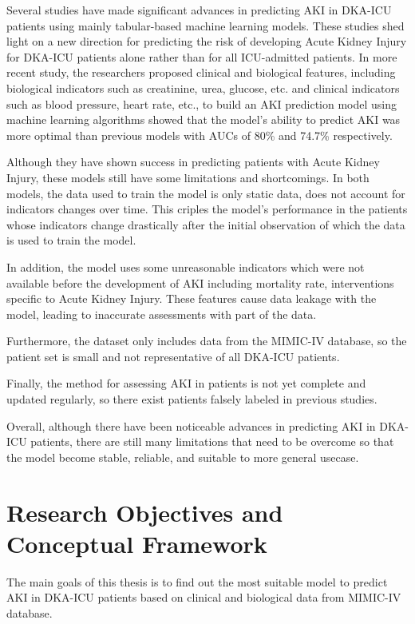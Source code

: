 \documentclass[../main.tex]{subfiles}
\begin{document}
Several studies have made significant advances in predicting AKI in DKA-ICU patients using mainly tabular-based machine learning models.
These studies shed light on a new direction for predicting the risk of developing Acute Kidney Injury for DKA-ICU patients alone rather than for all ICU-admitted patients.
In more recent study, the researchers proposed clinical and biological features, including biological indicators such as creatinine, urea, glucose, etc. and clinical indicators such as blood pressure, heart rate, etc., to build an AKI prediction model using machine learning algorithms showed that the model's ability to predict AKI was more optimal than previous models with AUCs of 80\% and 74.7\% respectively.

Although they have shown success in predicting patients with Acute Kidney Injury, these models still have some limitations and shortcomings.
In both models, the data used to train the model is only static data, does not account for indicators changes over time.
This criples the model's performance in the patients whose indicators change drastically after the initial observation of which the data is used to train the model.

In addition, the model uses some unreasonable indicators which were not available before the development of AKI including mortality rate, interventions specific to Acute Kidney Injury.
These features cause data leakage with the model, leading to inaccurate assessments with part of the data.

Furthermore, the dataset only includes data from the MIMIC-IV database, so the patient set is small and not representative of all DKA-ICU patients.

Finally, the method for assessing AKI in patients is not yet complete and updated regularly, so there exist patients falsely labeled in previous studies.

Overall, although there have been noticeable advances in predicting AKI in DKA-ICU patients, there are still many limitations that need to be overcome so that the model become stable, reliable, and suitable to more general usecase.



\section{Research Objectives and Conceptual Framework}

The main goals of this thesis is to find out the most suitable model to predict AKI in DKA-ICU patients based on clinical and biological data from MIMIC-IV database.
\end{document}
